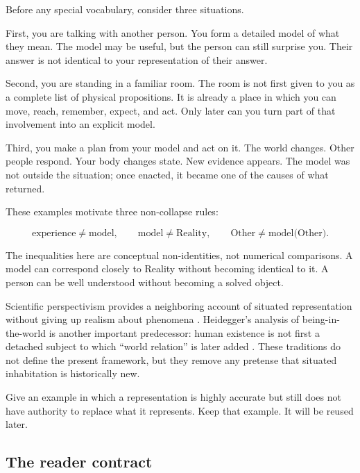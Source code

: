 \documentclass[11pt]{article}
\begin{document}
Before any special vocabulary, consider three situations.

First, you are talking with another person. You form a detailed model of what they mean. The model may be useful, but the person can still surprise you. Their answer is not identical to your representation of their answer.

Second, you are standing in a familiar room. The room is not first given to you as a complete list of physical propositions. It is already a place in which you can move, reach, remember, expect, and act. Only later can you turn part of that involvement into an explicit model.

Third, you make a plan from your model and act on it. The world changes. Other people respond. Your body changes state. New evidence appears. The model was not outside the situation; once enacted, it became one of the causes of what returned.

These examples motivate three non-collapse rules:

\begin{equation}
\text{experience}\neq\text{model},\qquad
\text{model}\neq\text{Reality},\qquad
\text{Other}\neq\text{model(Other)}.
\end{equation}

The inequalities here are conceptual non-identities, not numerical comparisons. A model can correspond closely to Reality without becoming identical to it. A person can be well understood without becoming a solved object.

Scientific perspectivism provides a neighboring account of situated representation without giving up realism about phenomena \cite{Massimi2022Perspectival}. Heidegger's analysis of being-in-the-world is another important predecessor: human existence is not first a detached subject to which ``world relation'' is later added \cite{Heidegger2026BeingTime,SEPHeidegger2025}. These traditions do not define the present framework, but they remove any pretense that situated inhabitation is historically new.

\begin{readercheck}
Give an example in which a representation is highly accurate but still does not have authority to replace what it represents. Keep that example. It will be reused later.
\end{readercheck}

\subsection{The reader contract}
\end{document}
